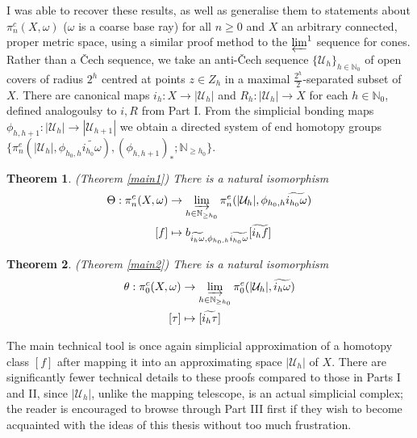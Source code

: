 \documentclass[a4paper,11pt]{article}
\theoremstyle{definition}
\theoremstyle{plain}
\newtheorem*{theorem*}{Theorem}
\theoremstyle{remark}
\begin{document}
I was able to recover these results, as well as generalise them to statements about $\pi_{n}^{c}(X,\omega)$ ($\omega$ is a coarse base ray) for all $n\geq 0$ and $X$ an arbitrary connected, proper metric space, using a similar proof method to the $\varprojlim^1$ sequence for cones. Rather than a \v{C}ech sequence, we take an anti-\v{C}ech sequence $\{\mathcal{U}_{h}\}_{h\in \mathbb{N}_{0}}$ of open covers of radius $2^h$ centred at points $z \in Z_{h}$ in a maximal $\frac{2^h}{2}$-separated subset of $X$. There are canonical maps $i_{h}: X\rightarrow |\mathcal{U}_{h}|$ and $R_{h}: |\mathcal{U}_{h}|\rightarrow X$ for each $h\in \mathbb{N}_{0}$, defined analogoulsy to $i,R$ from Part I.  From the simplicial bonding maps $\phi_{h,h+1}: |\mathcal{U}_{h}|\rightarrow |\mathcal{U}_{h+1}|$ we obtain a directed system of end homotopy groups $\{\pi_{n}^{e}(|\mathcal{U}_{h}|,\phi_{h_0,h} \widetilde{i_{h_0}\omega}), (\phi_{h,h+1})_{\ast}; \mathbb{N}_{\geq h_0}\}$.

\begin{theorem*} (Theorem \ref{main1}) There is a natural isomorphism 
\begin{align*}
\Theta: \pi_{n}^{c}(X,\omega) &\rightarrow \varinjlim_{h\in \mathbb{N}_{\geq h_0}}\pi^{e}_{n}(|\mathcal{U}_{h}|, \phi_{h_0,h} \widetilde{i_{h_0}\omega})\\
[f] &\mapsto b_{\widetilde{i_{h}\omega},\phi_{h_0,h} \widetilde{i_{h_0}\omega}}[\widetilde{i_{h} f}]
\end{align*}
\end{theorem*}


\begin{theorem*} (Theorem \ref{main2}) There is a natural isomorphism 
\begin{align*}
\theta: \pi_{0}^{c}(X,\omega) &\rightarrow \varinjlim_{h\in \mathbb{N}_{\geq h_0}}\pi^{e}_{0}(|\mathcal{U}_{h}|, \widetilde{i_{h}\omega})\\
[\tau] &\mapsto [\widetilde{i_{h} \tau}]
\end{align*}
\end{theorem*}

The main technical tool is once again simplicial approximation of a homotopy class $[f]$ after mapping it into an approximating space $|\mathcal{U}_{h}|$ of $X$. There are significantly fewer technical details to these proofs compared to those in Parts I and II, since $|\mathcal{U}_{h}|$, unlike the mapping telescope, is an actual simplicial complex; the reader is encouraged to browse through Part III first if they wish to become acquainted with the ideas of this thesis without too much frustration. \\
\end{document}
